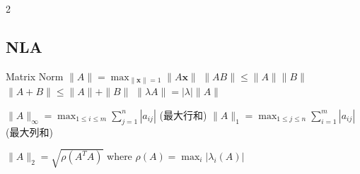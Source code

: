 \documentclass{note}
\begin{document}
\begin{multicols}{2}
{{    \subsection{NLA}
    \begin{MyTh}{Matrix Norm} \tiny
        $\|A\| = \max_{\|\mathbf{x}\|=1} \|A\mathbf{x}\|$ \quad $\|AB\| \leq \|A\|\|B\|$ \quad $\|A + B\| \leq \|A\| + \|B\|$ \quad $\|\lambda A\| = |\lambda|\|A\|$

        \quad $\|A\|_{\infty} = \max_{1\leq i \leq m} \sum_{j=1}^n |a_{ij}|$ (最大行和) \quad $\|A\|_1 = \max_{1\leq j \leq n} \sum_{i=1}^m |a_{ij}|$ (最大列和)
        
        \quad $\|A\|_2 = \sqrt{\rho(A^TA)}$ \quad where $\rho(A)=\max_i|\lambda_i(A)|$ \quad {} \quad {}
    \end{MyTh}
    }}

\end{multicols}

\newpage
\end{document}
